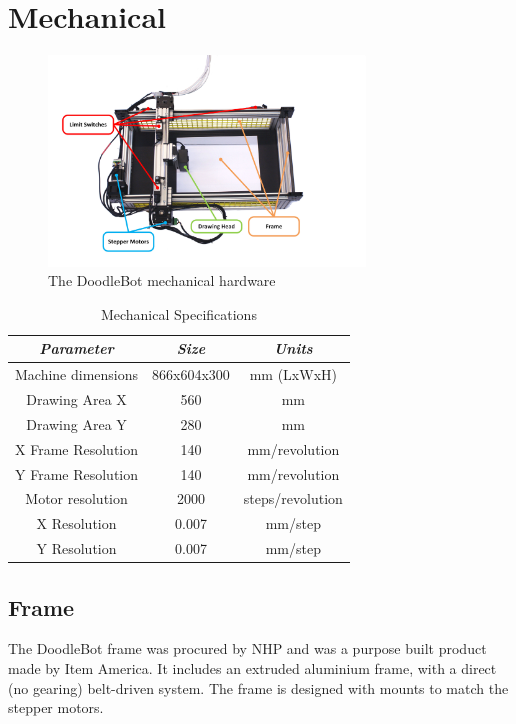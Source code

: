 \section{Mechanical}
\label{sec:implementation-mechanical}

\begin{figure}[h]
	\centering
	\includegraphics[trim=10mm 0mm 40mm 28mm, clip, width=0.75\textwidth]{figures/cncMachine/mechanical.jpg}
	\caption{The DoodleBot mechanical hardware}
	\label{fig:implementation-mechanical}
\end{figure}

\begin{table}[h]
	\centering
	\begin{tabular}{|c|c|c|}
		\hline
		\emph{Parameter} & \emph{Size} & \emph{Units}\\ \hline
		Machine dimensions & 866x604x300 & mm (LxWxH)\\ \hline
		Drawing Area X & 560 & mm\\ \hline
		Drawing Area Y & 280 & mm\\ \hline
		X Frame Resolution & 140 & mm/revolution\\ \hline
		Y Frame Resolution & 140 & mm/revolution\\ \hline
		Motor resolution & 2000 & steps/revolution\\ \hline
		X Resolution & 0.007 & mm/step\\ \hline 
		Y Resolution & 0.007 & mm/step\\ \hline
	\end{tabular}
	\caption{Mechanical Specifications}
\end{table}

\subsection{Frame}
	The DoodleBot frame was procured by NHP and was a purpose built product made by Item America. It includes an extruded aluminium frame, with a direct (no gearing) belt-driven system. The frame is designed with mounts to match the stepper motors. 
